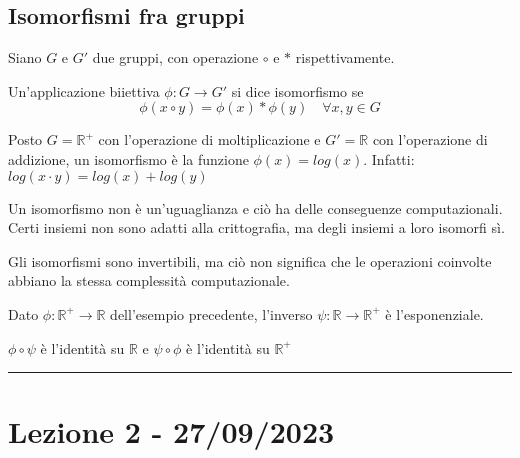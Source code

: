 \documentclass[11pt]{article}
\begin{document}
\subsection{Isomorfismi fra gruppi}
    \begin{definition}{}{}
        Siano $G$ e $G'$ due gruppi, con operazione $\circ$ e $*$ rispettivamente.
        
        Un'applicazione biiettiva $\phi : G \rightarrow G'$ si dice isomorfismo se
        $$\phi(x \circ y) = \phi(x) * \phi(y) \quad \forall x,y \in G$$
    \end{definition}

    \begin{example}{}{}
        Posto $G = \mathbb{R}^+$ con l'operazione di moltiplicazione e $G'=\mathbb{R}$ con l'operazione di addizione, un isomorfismo è la funzione $\phi(x) = log(x)$. Infatti: $log(x \cdot y) = log(x) + log(y)$
    \end{example}
    
    Un isomorfismo non è un'uguaglianza e ciò ha delle conseguenze computazionali.
    Certi insiemi non sono adatti alla crittografia, ma degli insiemi a loro isomorfi sì.

    Gli isomorfismi sono invertibili, ma ciò non significa che le operazioni coinvolte abbiano la stessa complessità computazionale.

    \begin{example}{}{}
        Dato $\phi : \mathbb{R}^+ \rightarrow \mathbb{R}$ dell'esempio precedente, l'inverso $\psi: \mathbb{R} \rightarrow \mathbb{R}^+$ è l'esponenziale.

        $\phi \circ \psi$ è l'identità su $\mathbb{R}$ e $\psi \circ \phi$ è l'identità su $\mathbb{R}^+$
    \end{example}
    
\vspace{0.5cm}
\hrule
\vspace{0.5cm}

\section{Lezione 2 - 27/09/2023}
\end{document}
